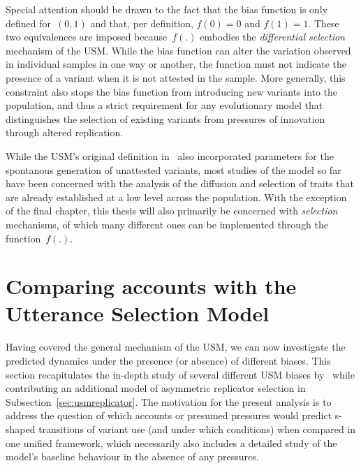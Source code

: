 Special attention should be drawn to the fact that the bias function is only defined for~$(0,1)$ and that, per definition, $f(0)=0$ and $f(1)=1$. These two equivalences are imposed because~$f(.)$ embodies the \emph{differential selection} mechanism of the USM. While the bias function can alter the variation observed in individual samples in one way or another, the function must not indicate the presence of a variant when it is not attested in the sample. More generally, this constraint also stops the bias function from introducing new variants into the population, and thus a strict requirement for any evolutionary model that distinguishes the selection of existing variants from pressures of innovation through altered replication.

While the USM's original definition in~\citet{Baxter2006} also incorporated parameters for the spontanous generation of unattested variants, most studies of the model so far have been concerned with the analysis of the diffusion and selection of traits that are already established at a low level across the population. With the exception of the final chapter, this thesis will also primarily be concerned with \emph{selection} mechanisms, of which many different ones can be implemented through the function~$f(.)$.


\section{Comparing accounts with the Utterance Selection Model}

Having covered the general mechanism of the USM, we can now investigate the predicted dynamics under the presence (or absence) of different biases. This section recapitulates the in-depth study of several different USM biases by~\citet{Blythe2012} while contributing an additional model of asymmetric replicator selection in Subsection~\ref{sec:usmreplicator}. The motivation for the present analysis is to address the question of which accounts or presumed pressures would predict s-shaped transitions of variant use (and under which conditions) when compared in one unified framework, which necessarily also includes a detailed study of the model's baseline behaviour in the absence of any pressures.

